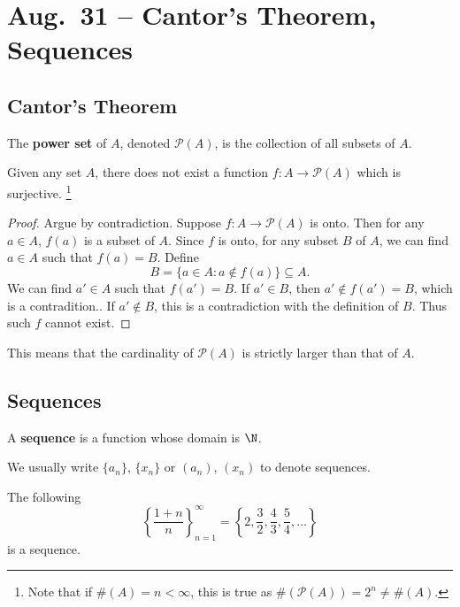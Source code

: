 \chapter{Aug.~31 -- Cantor's Theorem, Sequences}


\section{Cantor's Theorem}

\begin{definition}
  The \textbf{power set} of $A$, denoted $\mathcal{P}(A)$,
  is the collection of all
  subsets of $A$.
\end{definition}

\begin{theorem}
  Given any set $A$, there does not exist a function
  $f : A \to \mathcal{P}(A)$ which is surjective.
  \footnote{Note that if $\#(A) = n < \infty$, this is
    true as $\#(\mathcal{P}(A)) = 2^n \ne \#(A)$.}
\end{theorem}

\begin{proof}
  Argue by contradiction. Suppose
  $f : A \to \mathcal{P}(A)$ is onto.
  Then for any $a \in A$, $f(a)$ is a subset of $A$.
  Since $f$ is onto, for any subset $B$ of $A$, we
  can find $a \in A$ such that $f(a) = B$. Define
  \[B = \{a \in A : a \notin f(a)\} \subseteq A.\]
  We can find $a' \in A$ such that $f(a') = B$.
  If  $a' \in B$, then $a' \notin f(a') = B$,
  which is a contradition.. If $a' \notin B$,
  this is a contradiction with the definition of
  $B$. Thus such $f$ cannot exist.
\end{proof}

\begin{remark}
  This means that the cardinality of $\mathcal{P}(A)$
  is strictly larger than that of $A$.
\end{remark}

\section{Sequences}
\begin{definition}
  A \textbf{sequence} is a function whose domain
  is $\N$.
\end{definition}

We usually write $\{a_n\}$, $\{x_n\}$
or $(a_n)$, $(x_n)$ to denote sequences.

\begin{example}
  The following
  \[\left\{\frac{1+n}{n}\right\}_{n=1}^\infty = \left\{2, \frac{3}{2}, \frac{4}{3}, \frac{5}{4}, \dots\right\}\]
  is a sequence.
\end{example}

